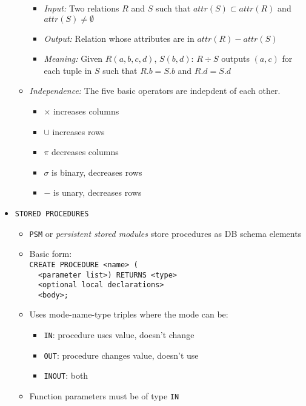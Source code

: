 \documentclass[landscape,8pt]{extarticle}
\newcommand{\code}{\lstinline}
\begin{document}
\begin{multicols}{4}
\begin{itemize}
\begin{itemize}
        \begin{itemize}
            \item \emph{Input:} Two relations $R$ and $S$ such that $attr(S) \subset attr(R)$ and
            $attr(S) \neq \emptyset$
            \item \emph{Output:} Relation whose attributes are in $attr(R) - attr(S)$
            \item \emph{Meaning:} Given $R(a,b,c,d)$, $S(b,d)$: $R \div S$ outputs $(a,c)$ for each
            tuple in $S$ such that $R.b = S.b$ and $R.d = S.d$
        \end{itemize}
        \item \emph{Independence:} The five basic operators are indepdent of each other.
        \begin{itemize}
            \item $\times$ increases columns
            \item $\cup$ increases rows
            \item $\pi$ decreases columns
            \item $\sigma$ is binary, decreases rows
            \item $-$ is unary, decreases rows
        \end{itemize}
    \end{itemize}
    \item \code{STORED PROCEDURES}
    \begin{itemize}
        \item \code{PSM} or \emph{persistent stored modules} store procedures as DB schema elements
        \item Basic form:\\
\code{CREATE PROCEDURE <name> (}\\
\code{  <parameter list>) RETURNS <type>}\\
\code{  <optional local declarations>}\\
\code{  <body>;}
        \item Uses mode-name-type triples where the mode can be:
        \begin{itemize}
            \item \code{IN}: procedure uses value, doesn't change 
            \item \code{OUT}: procedure changes value, doesn't use
            \item \code{INOUT}: both
        \end{itemize}
        \item Function parameters must be of type \code{IN}

\end{itemize}
\end{itemize}
\end{multicols}
\end{document}
